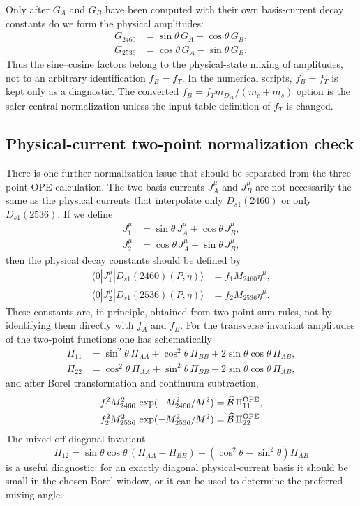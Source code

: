 \documentclass[11pt]{article}
\newcommand{\Dsone}{D_{s1}}
\begin{document}
Only after $G_A$ and $G_B$ have been computed with their own basis-current
decay constants do we form the physical amplitudes:
\begin{align}
  G_{2460}
  &=
  \sin\theta\,G_A+\cos\theta\,G_B,\\
  G_{2536}
  &=
  \cos\theta\,G_A-\sin\theta\,G_B.
\end{align}
Thus the sine--cosine factors belong to the physical-state mixing of amplitudes,
not to an arbitrary identification $f_B=f_T$.  In the numerical scripts,
$f_B=f_T$ is kept only as a diagnostic.  The converted
$f_B=f_T m_{D_{s1}}/(m_c+m_s)$ option is the safer central normalization unless
the input-table definition of $f_T$ is changed.

\subsection{Physical-current two-point normalization check}

There is one further normalization issue that should be separated from the
three-point OPE calculation.  The two basis currents $J_A^\mu$ and $J_B^\mu$
are not necessarily the same as the physical currents that interpolate only
$\Dsone(2460)$ or only $\Dsone(2536)$.  If we define
\begin{align}
  J_1^\mu &= \sin\theta\,J_A^\mu+\cos\theta\,J_B^\mu,\\
  J_2^\mu &= \cos\theta\,J_A^\mu-\sin\theta\,J_B^\mu,
\end{align}
then the physical decay constants should be defined by
\begin{align}
  \langle0|J_1^\mu|\Dsone(2460)(P,\eta)\rangle
  &= f_1 M_{2460}\eta^\mu,\\
  \langle0|J_2^\mu|\Dsone(2536)(P,\eta)\rangle
  &= f_2 M_{2536}\eta^\mu .
\end{align}
These constants are, in principle, obtained from two-point sum rules, not by
identifying them directly with $f_A$ and $f_B$.  For the transverse invariant
amplitudes of the two-point functions one has schematically
\begin{align}
  \Pi_{11}
  &= \sin^2\theta\,\Pi_{AA}
     +\cos^2\theta\,\Pi_{BB}
     +2\sin\theta\cos\theta\,\Pi_{AB},\\
  \Pi_{22}
  &= \cos^2\theta\,\Pi_{AA}
     +\sin^2\theta\,\Pi_{BB}
     -2\sin\theta\cos\theta\,\Pi_{AB},
\end{align}
and after Borel transformation and continuum subtraction,
\begin{align}
  f_1^2 M_{2460}^2\,\exp(-M_{2460}^2/M^2)
  &=
  \widehat{\mathcal B}\,\Pi_{11}^{\rm OPE},\\
  f_2^2 M_{2536}^2\,\exp(-M_{2536}^2/M^2)
  &=
  \widehat{\mathcal B}\,\Pi_{22}^{\rm OPE}.
\end{align}
The mixed off-diagonal invariant
\begin{equation}
  \Pi_{12}
  =\sin\theta\cos\theta\,(\Pi_{AA}-\Pi_{BB})
   +(\cos^2\theta-\sin^2\theta)\Pi_{AB}
\end{equation}
is a useful diagnostic: for an exactly diagonal physical-current basis it
should be small in the chosen Borel window, or it can be used to determine the
preferred mixing angle.
\end{document}
